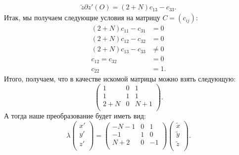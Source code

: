 \begin{itemize}[leftmargin=0.6cm]
\begin{align*}
{    \widetilde{z}}{\partial z'} (O) = (2 + N) c_{13} - c_{33}
    .\end{align*}
    Итак, мы получаем следующие условия на матрицу \(C = (c_{ij})\): 
    \begin{align*}
        (2 + N) c_{11} - c_{31} &= 0 \\
        (2 + N) c_{12} - c_{32} &= 0 \\
        (2 + N) c_{13} - c_{33} &\ne  0 \\
        c_{12} = c_{32} &= 0 \\
        c_{22} &= 1
    .\end{align*}
    Итого, получаем, что в качестве искомой матрицы можно взять следующую:
    \[
    \begin{pmatrix}
        1 & 0 & 1 \\
        1 & 1 &  1\\
        2 + N & 0  & N + 1 \\
    \end{pmatrix}
    .\] 
    А тогда наше преобразование будет иметь вид:
    \[
    \lambda \begin{pmatrix}
        x' \\
        y' \\
        z' \\
    \end{pmatrix} = 
    \begin{pmatrix}
        -N - 1 & 0 & 1 \\
        -1 & 1 & 0 \\
        N + 2 & 0 & -1 \\
    \end{pmatrix}
    \begin{pmatrix}
        \widetilde{x} \\
        \widetilde{y} \\
        \widetilde{z} \\
    \end{pmatrix} .\] 
    

\end{itemize}
